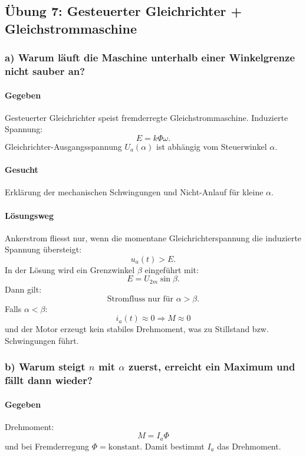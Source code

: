 \subsection{Übung 7: Gesteuerter Gleichrichter + Gleichstrommaschine}

\subsubsection*{a) Warum läuft die Maschine unterhalb einer Winkelgrenze nicht sauber an?}

\paragraph{Gegeben}
Gesteuerter Gleichrichter speist fremderregte Gleichstrommaschine.
Induzierte Spannung:
\[
\boxed{E = k\Phi \omega.}
\]
Gleichrichter-Ausgangsspannung $U_a(\alpha)$ ist abhängig vom Steuerwinkel $\alpha$.

\paragraph{Gesucht}
Erklärung der mechanischen Schwingungen und Nicht-Anlauf für kleine $\alpha$.

\paragraph{Lösungsweg}
Ankerstrom fliesst nur, wenn die momentane Gleichrichterspannung die induzierte Spannung übersteigt:
\[
u_a(t) > E.
\]
In der Lösung wird ein Grenzwinkel $\beta$ eingeführt mit:
\[
\boxed{E = U_{2m}\sin\beta}.
\]
Dann gilt:
\[
\boxed{\text{Stromfluss nur für }\alpha>\beta.}
\]
Falls $\alpha<\beta$:
\[
i_a(t)\approx 0\Rightarrow M\approx 0
\]
und der Motor erzeugt kein stabiles Drehmoment, was zu Stillstand bzw. Schwingungen führt.


\subsubsection*{b) Warum steigt $n$ mit $\alpha$ zuerst, erreicht ein Maximum und fällt dann wieder?}

\paragraph{Gegeben}
Drehmoment:
\[
\boxed{M=I_a\Phi}
\]
und bei Fremderregung $\Phi=\mathrm{konstant}$.
Damit bestimmt $I_a$ das Drehmoment.

